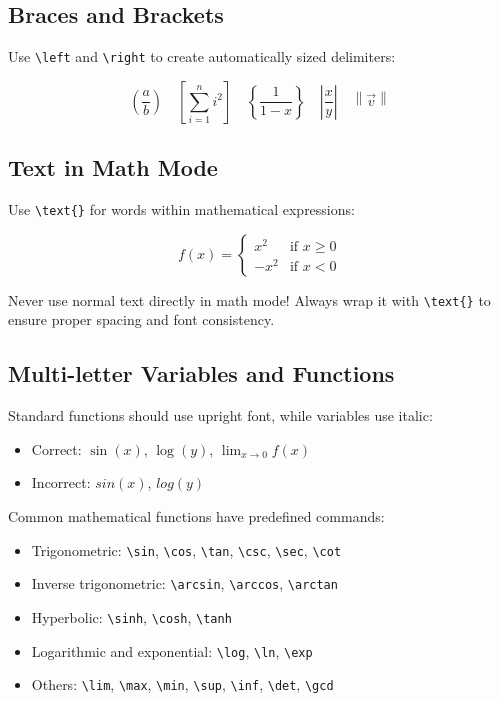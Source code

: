 \documentclass[11pt,a4paper]{article}
\DeclareMathOperator{\gcd}{gcd}     %
\begin{document}
\subsection{Braces and Brackets}

Use \verb|\left| and \verb|\right| to create automatically sized delimiters:

\begin{equation}
    \left( \frac{a}{b} \right) \quad
    \left[ \sum_{i=1}^{n} i^2 \right] \quad
    \left\{ \frac{1}{1-x} \right\} \quad
    \left| \frac{x}{y} \right| \quad
    \left\| \vec{v} \right\|
\end{equation}

\subsection{Text in Math Mode}

Use \verb|\text{}| for words within mathematical expressions:

\begin{equation}
    f(x) = 
    \begin{cases}
        x^2 & \text{if $x \geq 0$} \\
        -x^2 & \text{if $x < 0$}
    \end{cases}
\end{equation}

\begin{warningbox}
Never use normal text directly in math mode! Always wrap it with \verb|\text{}| to ensure proper spacing and font consistency.
\end{warningbox}

\subsection{Multi-letter Variables and Functions}

Standard functions should use upright font, while variables use italic:

\begin{itemize}
    \item Correct: $\sin(x)$, $\log(y)$, $\lim_{x \to 0} f(x)$
    \item Incorrect: $sin(x)$, $log(y)$
\end{itemize}

Common mathematical functions have predefined commands:
\begin{itemize}
    \item Trigonometric: \verb|\sin|, \verb|\cos|, \verb|\tan|, \verb|\csc|, \verb|\sec|, \verb|\cot|
    \item Inverse trigonometric: \verb|\arcsin|, \verb|\arccos|, \verb|\arctan|
    \item Hyperbolic: \verb|\sinh|, \verb|\cosh|, \verb|\tanh|
    \item Logarithmic and exponential: \verb|\log|, \verb|\ln|, \verb|\exp|
    \item Others: \verb|\lim|, \verb|\max|, \verb|\min|, \verb|\sup|, \verb|\inf|, \verb|\det|, \verb|\gcd|
\end{itemize}
\end{document}
